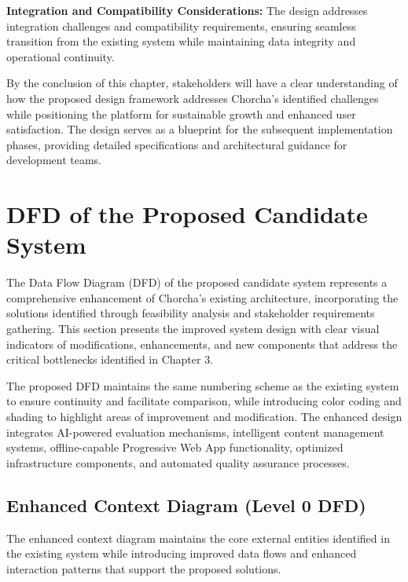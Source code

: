 \documentclass[12pt,a4paper,oneside]{book}
\begin{document}
\textbf{Integration and Compatibility Considerations:} The design addresses integration challenges and compatibility requirements, ensuring seamless transition from the existing system while maintaining data integrity and operational continuity.

By the conclusion of this chapter, stakeholders will have a clear understanding of how the proposed design framework addresses Chorcha's identified challenges while positioning the platform for sustainable growth and enhanced user satisfaction. The design serves as a blueprint for the subsequent implementation phases, providing detailed specifications and architectural guidance for development teams.

\section{DFD of the Proposed Candidate System}

The Data Flow Diagram (DFD) of the proposed candidate system represents a comprehensive enhancement of Chorcha's existing architecture, incorporating the solutions identified through feasibility analysis and stakeholder requirements gathering. This section presents the improved system design with clear visual indicators of modifications, enhancements, and new components that address the critical bottlenecks identified in Chapter 3.

The proposed DFD maintains the same numbering scheme as the existing system to ensure continuity and facilitate comparison, while introducing color coding and shading to highlight areas of improvement and modification. The enhanced design integrates AI-powered evaluation mechanisms, intelligent content management systems, offline-capable Progressive Web App functionality, optimized infrastructure components, and automated quality assurance processes.

\subsection{Enhanced Context Diagram (Level 0 DFD)}

The enhanced context diagram maintains the core external entities identified in the existing system while introducing improved data flows and enhanced interaction patterns that support the proposed solutions.
\end{document}
